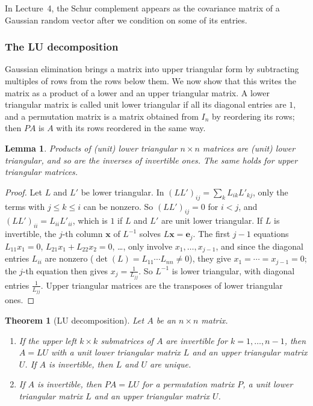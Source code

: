 \documentclass[11pt]{article}
\theoremstyle{definition}
\theoremstyle{plain}
\newtheorem{theorem}[definition]{Theorem}
\newtheorem{lemma}[definition]{Lemma}
\theoremstyle{remark}
\begin{document}
In Lecture~4, the Schur complement appears as the covariance matrix of a Gaussian random vector after we condition on some of its entries.

\subsubsection{The LU decomposition}

Gaussian elimination brings a matrix into upper triangular form by subtracting multiples of rows from the rows below them. We now show that this writes the matrix as a product of a lower and an upper triangular matrix. A lower triangular matrix is called unit lower triangular if all its diagonal entries are $1$, and a permutation matrix is a matrix obtained from $I_n$ by reordering its rows; then $PA$ is $A$ with its rows reordered in the same way.

\begin{lemma}\label{lem:triangular-products}
    Products of (unit) lower triangular $n \times n$ matrices are (unit) lower triangular, and so are the inverses of invertible ones. The same holds for upper triangular matrices.
\end{lemma}

\begin{proof}
    Let $L$ and $L'$ be lower triangular. In $(LL')_{ij} = \sum_k L_{ik}L'_{kj}$, only the terms with $j \leq k \leq i$ can be nonzero. So $(LL')_{ij} = 0$ for $i < j$, and $(LL')_{ii} = L_{ii}L'_{ii}$, which is $1$ if $L$ and $L'$ are unit lower triangular. If $L$ is invertible, the $j$-th column $\mathbf{x}$ of $L^{-1}$ solves $L\mathbf{x} = \mathbf{e}_j$. The first $j - 1$ equations $L_{11}x_1 = 0$, $L_{21}x_1 + L_{22}x_2 = 0$, \ldots, only involve $x_1, \ldots, x_{j-1}$, and since the diagonal entries $L_{ii}$ are nonzero ($\det(L) = L_{11} \cdots L_{nn} \neq 0$), they give $x_1 = \cdots = x_{j-1} = 0$; the $j$-th equation then gives $x_j = \frac{1}{L_{jj}}$. So $L^{-1}$ is lower triangular, with diagonal entries $\frac{1}{L_{jj}}$. Upper triangular matrices are the transposes of lower triangular ones.
\end{proof}

\begin{theorem}[LU decomposition]\label{thm:lu}
    Let $A$ be an $n \times n$ matrix.
    \begin{enumerate}
        \item If the upper left $k \times k$ submatrices of $A$ are invertible for $k = 1, \ldots, n - 1$, then $A = LU$ with a unit lower triangular matrix $L$ and an upper triangular matrix $U$. If $A$ is invertible, then $L$ and $U$ are unique.
        \item If $A$ is invertible, then $PA = LU$ for a permutation matrix $P$, a unit lower triangular matrix $L$ and an upper triangular matrix $U$.
    \end{enumerate}
\end{theorem}
\end{document}
